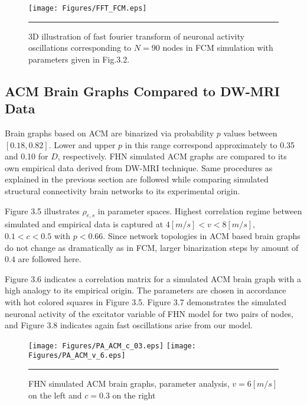 \begin{figure}[htbp]
 
  \centering
	 \texttt{[image: Figures/FFT\_FCM.eps]} 

    \rule{35em}{0.5pt}
  \caption[3D Fast Fourier Transform, FHN, FCM]{3D illustration of fast fourier transform of neuronal activity oscillations corresponding to $N=90$ nodes in FCM simulation with parameters given in Fig.3.2.} 
    \label{fig:3D Fast Fourier Transform, FHN, FCM}
 	
\end{figure}  
 


\subsection{ACM Brain Graphs Compared to DW-MRI Data}

Brain graphs based on ACM are binarized via probability $p$ values between $[0.18, 0.82]$. Lower and upper $p$ in this range correspond approximately to 0.35 and 0.10 for $D$, respectively. FHN simulated ACM graphs are compared to its own empirical data derived from DW-MRI technique. Same procedures as explained in the previous section are followed while comparing simulated structural connectivity brain networks to its experimental origin.

Figure 3.5 illustrates $\rho_{e,s}$ in parameter spaces. Highest correlation regime between simulated and empirical data is captured at $4[m/s]<v<8[m/s]$, $0.1<c<0.5$ with $p<0.66$. Since network topologies in ACM based brain graphs do not change as dramatically as in FCM, larger binarization steps by amount of $0.4$ are followed here. 

Figure 3.6 indicates a correlation matrix for a simulated ACM brain graph with a high analogy to its empirical origin. The parameters are chosen in accordance with hot colored squares in Figure 3.5. Figure 3.7 demonstrates the simulated neuronal activity of the excitator variable of FHN model for two pairs of nodes, and Figure 3.8 indicates again fast oscillations arise from our model.  

\begin{figure}[htbp]
 
  \centering
    \texttt{[image: Figures/PA\_ACM\_c\_03.eps]} 
	\texttt{[image: Figures/PA\_ACM\_v\_6.eps]} 

	
    \rule{35em}{0.5pt}
  \caption[Parameter Analysis, ACM]{FHN simulated ACM brain graphs, parameter analysis, $v=6[m/s]$ on the left and $c=0.3$ on the right }
  \label{fig:Parameter Analysis, ACM}
 	
\end{figure} 

